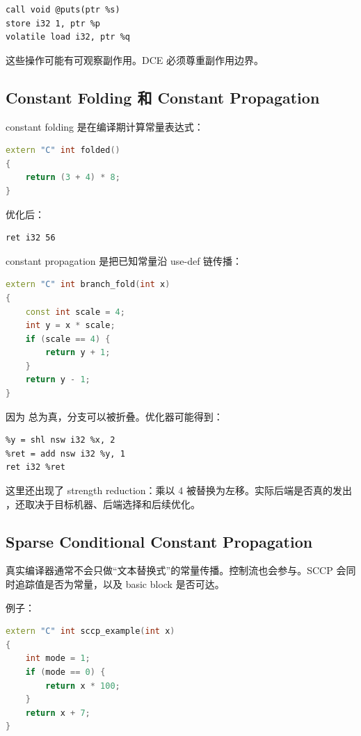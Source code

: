 \begin{lstlisting}
call void @puts(ptr %s)
store i32 1, ptr %p
volatile load i32, ptr %q
\end{lstlisting}

这些操作可能有可观察副作用。DCE 必须尊重副作用边界。

\subsection{Constant Folding 和 Constant Propagation}

constant folding 是在编译期计算常量表达式：

\begin{lstlisting}[language=C++]
extern "C" int folded()
{
    return (3 + 4) * 8;
}
\end{lstlisting}

优化后：

\begin{lstlisting}
ret i32 56
\end{lstlisting}

constant propagation 是把已知常量沿 use-def 链传播：

\begin{lstlisting}[language=C++]
extern "C" int branch_fold(int x)
{
    const int scale = 4;
    int y = x * scale;
    if (scale == 4) {
        return y + 1;
    }
    return y - 1;
}
\end{lstlisting}

因为  总为真，分支可以被折叠。优化器可能得到：

\begin{lstlisting}
%y = shl nsw i32 %x, 2
%ret = add nsw i32 %y, 1
ret i32 %ret
\end{lstlisting}

这里还出现了 strength reduction：乘以 4 被替换为左移。实际后端是否真的发出 ，还取决于目标机器、后端选择和后续优化。

\subsection{Sparse Conditional Constant Propagation}

真实编译器通常不会只做“文本替换式”的常量传播。控制流也会参与。SCCP 会同时追踪值是否为常量，以及 basic block 是否可达。

例子：

\begin{lstlisting}[language=C++]
extern "C" int sccp_example(int x)
{
    int mode = 1;
    if (mode == 0) {
        return x * 100;
    }
    return x + 7;
}
\end{lstlisting}

